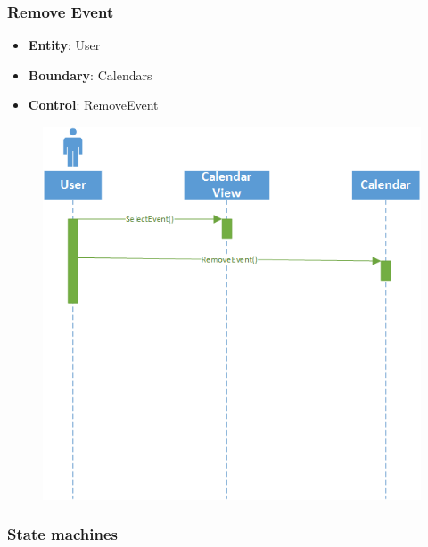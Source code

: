 \subsubsection{Remove Event}
\begin{itemize}
\item \textbf{Entity}: User
\item \textbf{Boundary}: Calendars
\item \textbf{Control}: RemoveEvent
\end{itemize}

\begin{figure}[h]
\includegraphics[scale=0.8]{figures/removeevent.png}
\end{figure}

\clearpage
\subsubsection{State machines}
